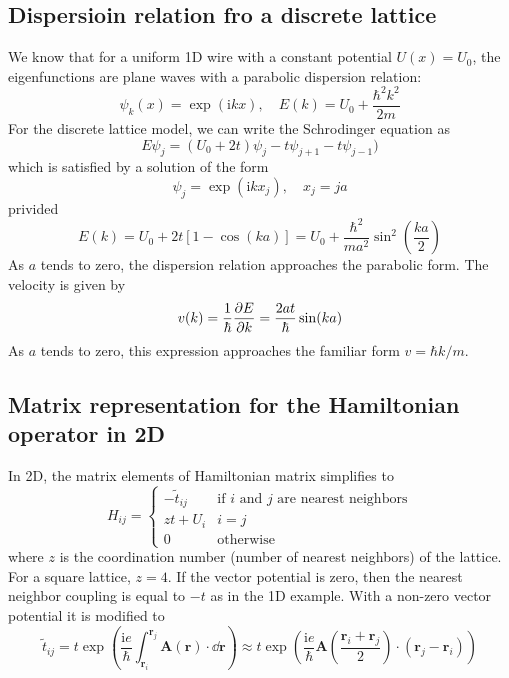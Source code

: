 \documentclass[11pt,a4paper]{book}
\theoremstyle{plain}
\theoremstyle{definition}
\theoremstyle{remark}
\newcommand{\ii}{\mathrm{i}}                      %
\renewcommand{\vec}[1]{\boldsymbol{#1}}
\begin{document}
\subsection{Dispersioin relation fro a discrete lattice}
We know that for a uniform 1D wire with a constant potential $U(x)=U_0$, the eigenfunctions are plane waves with a parabolic dispersion relation:
\begin{equation}
    \psi_k(x) = \exp (\ii k x), \quad E(k) = U_0 + \frac{\hbar^2 k^2}{2 m}
\end{equation}
For the discrete lattice model, we can write the Schrodinger equation as 
\begin{equation}
    E \psi_j = (U_0 + 2 t) \psi_j - t \psi_{j+1} - t \psi_{j-1})
\end{equation}
which is satisfied by a solution of the form
\begin{equation}
    \psi_j = \exp(\ii k x_j) ,\quad x_j = j a
\end{equation}
privided
\begin{equation}
    E(k) = U_0 + 2 t [1 - \cos(ka)] = U_0 + \frac{\hbar^2}{m a^2} \sin^2\left(\frac{ka}{2}\right)
\end{equation}
As $a$ tends to zero, the dispersion relation approaches the parabolic form. The velocity is given by
\begin{equation}
    v(k) = \frac{1}{\hbar} \pdv{E}{k} = \frac{2 a t}{\hbar} \sin(ka)
\end{equation}
As $a$ tends to zero, this expression approaches the familiar form $v = \hbar k/m$.
\subsection{Matrix representation for the Hamiltonian operator in 2D}
In 2D,  the matrix elements of Hamiltonian matrix simplifies to
\begin{equation}
    H_{ij} = \begin{cases}
        -\tilde{t}_{ij} & \mbox{if $i$ and $j$ are nearest neighbors} \\
        z t + U_i & i = j \\
        0 & \mbox{otherwise}
    \end{cases}
\end{equation}
where $z$ is the coordination number (number of nearest neighbors) of the lattice. For a square lattice, $z=4$. If the vector potential is zero, then the nearest neighbor coupling is equal to $-t$ as in the 1D example. With a non-zero vector potential it is modified to
\begin{equation}
    \tilde{t}_{ij} = t \exp\left(\frac{\ii e}{\hbar} \int_{\vec{r}_i}^{\vec{r}_j} \vec{A}(\vec{r}) \cdot \dd \vec{r} \right) \approx t \exp\left(\frac{\ii e}{\hbar} \vec{A}\left(\frac{\vec{r}_i + \vec{r}_j}{2}\right) \cdot (\vec{r}_j - \vec{r}_i) \right)
\end{equation}
\end{document}
